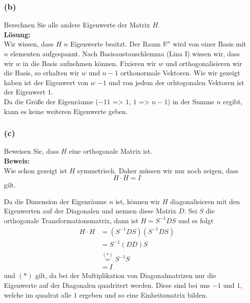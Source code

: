 \documentclass[11pt,a4paper,ngerman]{article}
\begin{document}
\subsubsection*{(b)}

Berechnen Sie alle andere Eigenwerte der Matrix $H$.\\

\textbf{Lösung:}\\

Wir wissen, dass $H$ $n$ Eigenwerte besitzt.
Der Raum $\mathbb{R}^n$ wird von einer Basis mit $n$ elementen aufgespannt.
Nach Basisaustauschlemma (Lina I) wissen wir, dass wir $w$ in die Basis aufnehmen können.
Fixieren wir $w$ und orthogonalisieren wir die Basis, so erhalten wir $w$ und $n-1$ orthonormale
Vektoren. Wie wir gezeigt haben ist der Eigenwert von $w$ $-1$ und von jedem der orhtogonalen Vektoren ist der
Eigenwert $1$.\\

Da die Größe der Eigenräume ($-11$ => $1$, $1$ => $n-1$) in der Summe $n$ ergibt, kann es keine weiteren Eigenwerte geben.

\subsubsection*{(c)}

Beweisen Sie, dass $H$ eine orthogonale Matrix ist.\\

\textbf{Beweis:}\\

Wie schon gezeigt ist $H$ symmetrisch. Daher müssen wir nur noch zeigen, dass
\begin{equation*}
    H \cdot H   = I
\end{equation*}
gilt.

Da die Dimension der Eigenräume $n$ ist, können wir $H$ diagonalisieren mit den Eigenwerten auf der Diagonalen und nennen
diese Matrix $D$.
Sei $S$ die orthogonale Transformationsmatrix, dann ist $H = S^{-1}DS$ und es folgt
\begin{equation*}\begin{split}
    H \cdot H &= (S^{-1} D S) (S^{-1} D S)\\
            &= S^{-1} (D D) S\\
            &\stackrel{(*)}{=} S^{-1} S\\
            &= I
\end{split}\end{equation*}
und $(*)$ gilt, da bei der Multiplikation von Diagonalmatrizen nur die Eigenwerte auf der Diagonalen quadritert werden.
Diese sind bei uns $-1$ und $1$, welche im quadrat alle $1$ ergeben und so eine Einheitsmatrix bilden.
\end{document}
